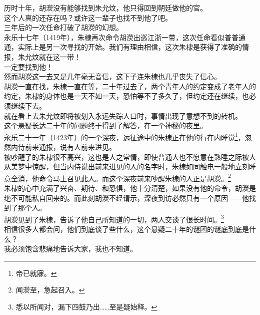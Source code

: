 \begin{multicols}{\theparacolNo}
历时十年，胡濙没有能够找到朱允炆，他只得回到朝廷做他的官。\\

这个人真的还存在吗？或许这一辈子也找不到他了吧。\\

三年后的一次任命打破了胡濙的幻想。\\

永乐十七年（1419年），朱棣再次命令胡濙出巡江浙一带，这次任命看似普普通通，实际上是另一次寻找的开始。我们有理由相信，这次朱棣是获得了准确的情报，朱允炆就在这一带！\\

一定要找到他！\\

然而胡濙这一去又是几年毫无音信，这下子连朱棣也几乎丧失了信心。\\

胡濙一直在找，朱棣一直在等，二十年过去了，两个青年人的约定变成了老年人的约定，朱棣的身体也是一天不如一天，恐怕等不了多久了，但约定还在继续，也必须继续下去。\\

就在看上去朱允炆即将被划入永远失踪人口时，事情出现了意想不到的转机。\\

这个悬疑长达二十年的问题终于得到了解答，在一个神秘的夜里。\\

永乐二十一年（1423年）的一个深夜，远征途中的朱棣正在他的行在内睡觉\footnote{帝已就寐。}，忽然内侍前来通报，说有人前来进见。\\

被吵醒了的朱棣很不高兴，这也是人之常情，即使普通人也不愿意在熟睡之际被人从美梦中惊醒，但当内侍说出前来进见的人的名字时，朱棣如同触电一般地立刻睡意全消，他命令马上召见此人。而这个深夜前来吵醒朱棣的人正是胡濙。\footnote{闻濙至，急起召入。}\\

朱棣的心中充满了兴奋、期待、和恐惧，他十分清楚，如果没有他的命令，胡濙是绝不可能私自回来的。而此刻胡濙不经请示，深夜到访必然只有一个原因——他找到了那个人。\\

胡濙见到了朱棣，告诉了他自己所知道的一切，两人交谈了很长时间。\footnote{悉以所闻对，漏下四鼓乃出……至是疑始释。}\\

相信很多人都会问，他们到底谈了些什么，这个悬疑二十年的谜团的谜底到底是什么？\\

我必须饱含悲痛地告诉大家，我也不知道。\\


\end{multicols}
